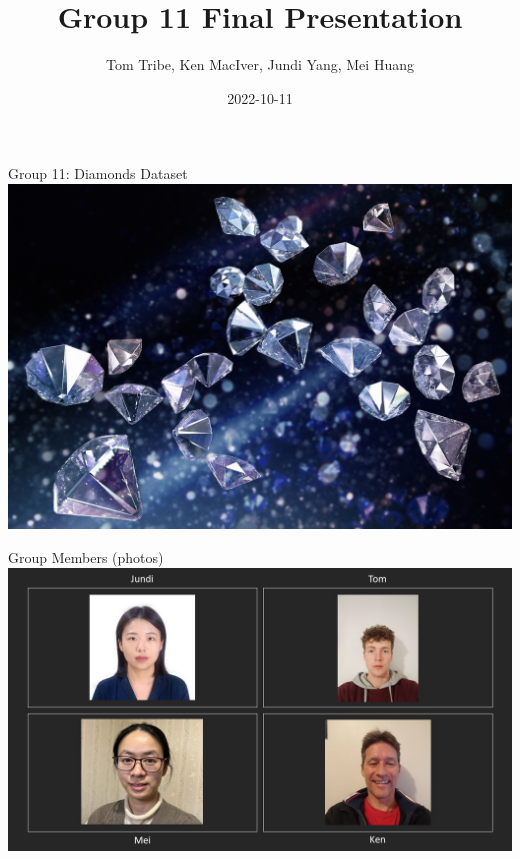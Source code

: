 \documentclass[
  ignorenonframetext,
]{beamer}
\title{Group 11 Final Presentation}
\author{Tom Tribe, Ken MacIver, Jundi Yang, Mei Huang}
\date{2022-10-11}
\begin{document}
\frame{\titlepage}

\begin{frame}{Group 11: Diamonds Dataset}
\protect\hypertarget{group-11-diamonds-dataset}{}
\includegraphics{./Diamonds.jpg}
\end{frame}

\begin{frame}{Group Members (photos)}
\protect\hypertarget{group-members-photos}{}
\includegraphics{./Photos3.jpg}
\end{frame}
\end{document}

